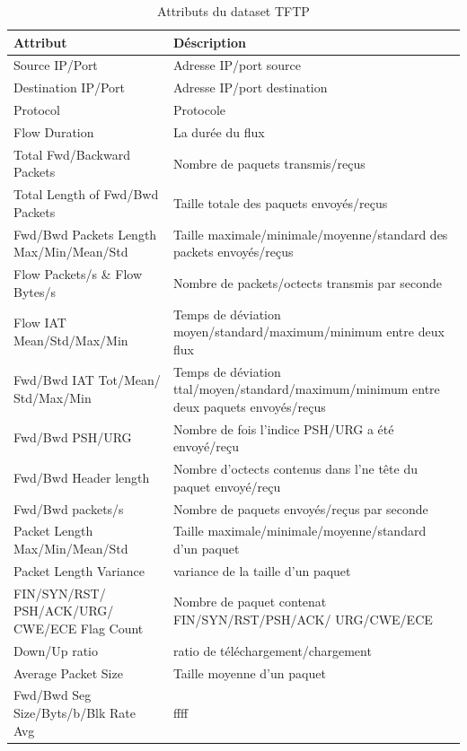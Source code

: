 \begin{table}[H]
\begin{center}
\begin{tabular}{ | m{4cm} | m{12cm} | }
\hline
\textbf{Attribut} & \textbf{Déscription}\\
\hline
Source IP/Port & Adresse IP/port source\\
\hline
Destination IP/Port & Adresse IP/port destination\\
\hline
Protocol & Protocole \\
\hline
Flow Duration &  La durée du flux\\
\hline
Total Fwd/Backward Packets & Nombre de paquets transmis/reçus \\
\hline
Total Length of Fwd/Bwd Packets & Taille totale des paquets envoyés/reçus \\
\hline
Fwd/Bwd Packets Length Max/Min/Mean/Std &  Taille maximale/minimale/moyenne/standard des packets envoyés/reçus\\ 
\hline
Flow Packets/s \& Flow Bytes/s & Nombre de packets/octects transmis par seconde\\
\hline
Flow IAT Mean/Std/Max/Min & Temps de déviation moyen/standard/maximum/minimum entre deux flux\\
\hline
Fwd/Bwd IAT Tot/Mean/ Std/Max/Min & Temps de déviation ttal/moyen/standard/maximum/minimum entre deux paquets envoyés/reçus\\
\hline
Fwd/Bwd PSH/URG & Nombre de fois l'indice PSH/URG a été envoyé/reçu\\
\hline
Fwd/Bwd Header length & Nombre d'octects contenus dans l'ne tête du paquet envoyé/reçu\\
\hline
Fwd/Bwd packets/s & Nombre de paquets envoyés/reçus par seconde\\
\hline
Packet Length Max/Min/Mean/Std & Taille maximale/minimale/moyenne/standard d'un paquet\\
\hline
Packet Length Variance & variance de la taille d'un paquet\\
\hline
FIN/SYN/RST/ PSH/ACK/URG/ CWE/ECE Flag Count & Nombre de paquet contenat FIN/SYN/RST/PSH/ACK/ URG/CWE/ECE\\
\hline
Down/Up ratio & ratio de téléchargement/chargement\\
\hline 
Average Packet Size & Taille moyenne d'un paquet\\
\hline
Fwd/Bwd Seg Size/Byts/b/Blk Rate Avg & ffff\\
\hline
\end{tabular}
\caption{Attributs du dataset TFTP}
\label{table:attributs}
\end{center}
\end{table}

